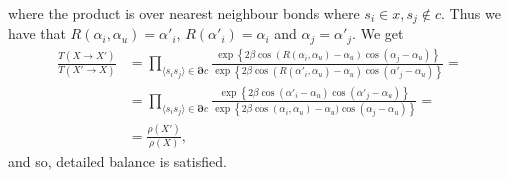 where the product is over nearest neighbour bonds where $s_i \in x, s_j \notin c$.
Thus we have that $ R(\alpha_i,\alpha_u) = \alpha'_i $, $R(\alpha'_i) = \alpha_i$ and $\alpha_j = \alpha'_j$.
We get
\begin{align}
  \frac{T(X\rightarrow X')}{T(X'\rightarrow X)}&= \prod_{\langle s_i s_j \rangle \in \bm{\partial} c} \frac{ \exp\left\{2\beta\cos(R(\alpha_i,\alpha_u) - \alpha_u)\cos(\alpha_j - \alpha_u)\right\}}{ \exp\left\{2\beta\cos(R(\alpha'_i,\alpha_u) - \alpha_u)\cos(\alpha'_j -\alpha_u)\right\}} = \\
  &= \prod_{\langle s_i s_j \rangle \in \bm{\partial} c} \frac{ \exp\left\{2\beta\cos(\alpha'_i - \alpha_u)\cos(\alpha'_j - \alpha_u)\right\}}{ \exp\left\{2\beta\cos(\alpha_i,\alpha_u) - \alpha_u)\cos(\alpha_j -\alpha_u)\right\}} = \\
  &= \frac{\rho(X')}{\rho(X)},
\end{align}
and so, detailed balance is satisfied.

